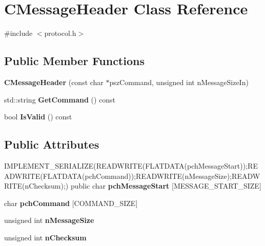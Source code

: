 \hypertarget{class_c_message_header}{}\section{C\+Message\+Header Class Reference}
\label{class_c_message_header}


{\ttfamily \#include $<$protocol.\+h$>$}

\subsection*{Public Member Functions}
\begin{DoxyCompactItemize}
\item 
\mbox{\label{class_c_message_header_a4e68c30f9e7e485c13157a27c4ebff8c}} 
{\bfseries C\+Message\+Header} (const char $\ast$psz\+Command, unsigned int n\+Message\+Size\+In)
\item 
\mbox{\label{class_c_message_header_ab5b3807481d4b918527b86523f1efee2}} 
std\+::string {\bfseries Get\+Command} () const
\item 
\mbox{\label{class_c_message_header_a45221ad4c5e867c80d4ca33eb8918f36}} 
bool {\bfseries Is\+Valid} () const
\end{DoxyCompactItemize}
\subsection*{Public Attributes}
\begin{DoxyCompactItemize}
\item 
\mbox{\label{class_c_message_header_a184e72a78696e72a4ac13b3a7c2e65a9}} 
I\+M\+P\+L\+E\+M\+E\+N\+T\+\_\+\+S\+E\+R\+I\+A\+L\+I\+ZE(R\+E\+A\+D\+W\+R\+I\+TE(F\+L\+A\+T\+D\+A\+TA(pch\+Message\+Start));R\+E\+A\+D\+W\+R\+I\+TE(F\+L\+A\+T\+D\+A\+TA(pch\+Command));R\+E\+A\+D\+W\+R\+I\+TE(n\+Message\+Size);R\+E\+A\+D\+W\+R\+I\+TE(n\+Checksum);) public char {\bfseries pch\+Message\+Start} \mbox{[}M\+E\+S\+S\+A\+G\+E\+\_\+\+S\+T\+A\+R\+T\+\_\+\+S\+I\+ZE\mbox{]}
\item 
\mbox{\label{class_c_message_header_a87d62b0d9afb3889f318991700a34431}} 
char {\bfseries pch\+Command} \mbox{[}C\+O\+M\+M\+A\+N\+D\+\_\+\+S\+I\+ZE\mbox{]}
\item 
\mbox{\label{class_c_message_header_a67ccb9f1f23af69e309a8d6c8bfff751}} 
unsigned int {\bfseries n\+Message\+Size}
\item 
\mbox{\label{class_c_message_header_ab9c6bec3694e2c110b4f358af9e55984}} 
unsigned int {\bfseries n\+Checksum}
\end{DoxyCompactItemize}


